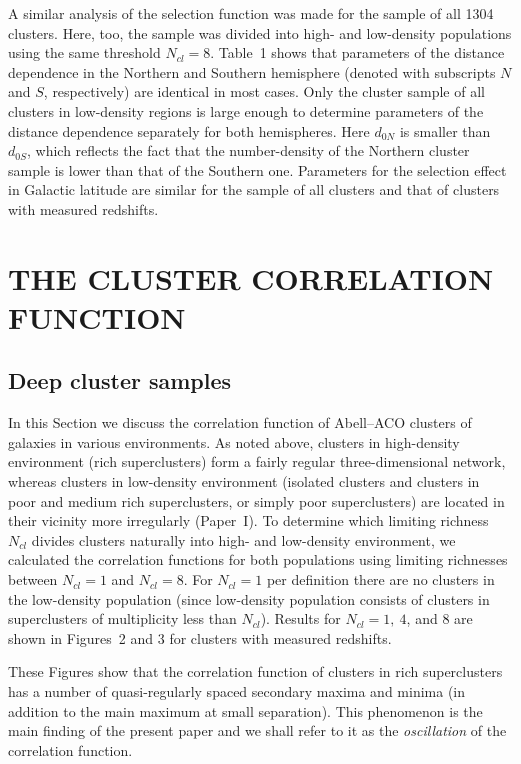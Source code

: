A similar analysis of the selection function was made for the sample
of all 1304 clusters. Here, too, the sample was divided into high- and
low-density populations using the same threshold $N_{cl}=8$.  Table~1
shows that parameters of the distance dependence in the Northern and
Southern hemisphere (denoted with subscripts $N$ and $S$,
respectively) are identical in most cases. Only the cluster sample of
all clusters in low-density regions is large enough to determine
parameters of the distance dependence separately for both hemispheres.
Here $d_{0N}$ is smaller than $d_{0S}$, which reflects the fact that
the number-density of the Northern cluster sample is lower than that
of the Southern one.  Parameters for the selection effect in Galactic
latitude are similar for the sample of all clusters and that of
clusters with measured redshifts.

\section{  THE CLUSTER CORRELATION FUNCTION}

\subsection{  Deep cluster samples}

In this Section we discuss the correlation function of Abell--ACO clusters of
galaxies in various environments.  As noted above, clusters in high-density
environment (rich superclusters) form a fairly regular three-dimensional
network, whereas clusters in low-density environment (isolated clusters and
clusters in poor and medium rich superclusters, or simply poor superclusters)
are located in their vicinity more irregularly (Paper~I). To determine which
limiting richness $N_{cl}$ divides clusters naturally into high- and
low-density environment, we calculated the correlation functions for both
populations using limiting richnesses between $N_{cl}=1$ and $N_{cl}=8$.  For
$N_{cl}=1$ per definition there are no clusters in the low-density population
(since low-density population consists of clusters in superclusters of
multiplicity less than $N_{cl}$). Results for $N_{cl}=1, ~4$, and 8 are shown
in Figures~2 and 3 for clusters with measured redshifts.

These Figures show that the correlation function of clusters in
rich superclusters has a number of quasi-regularly spaced
secondary maxima and minima (in addition to the main maximum at small
separation).  This phenomenon is the main finding of the present paper
and we shall refer to it as the {\it oscillation} of the correlation
function.


